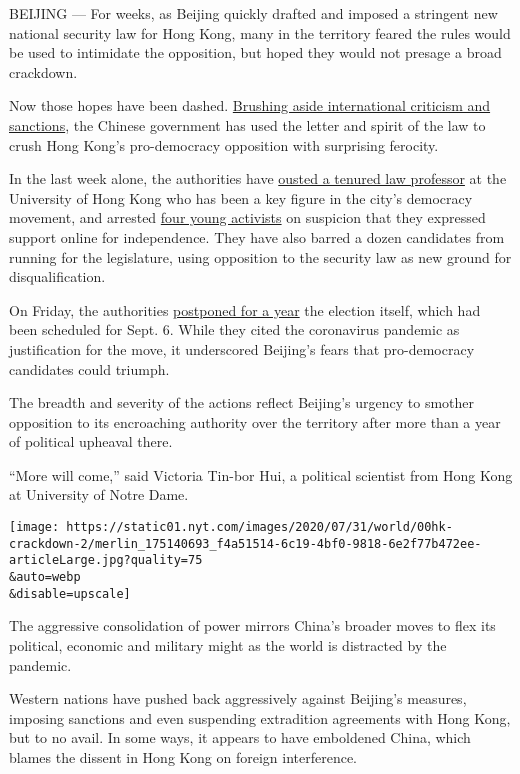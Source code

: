BEIJING --- For weeks, as Beijing quickly drafted and imposed a
stringent new national security law for Hong Kong, many in the territory
feared the rules would be used to intimidate the opposition, but hoped
they would not presage a broad crackdown.

Now those hopes have been dashed.
\href{https://www.nytimes.com/2020/07/15/world/asia/china-trump-hong-kong.html}{Brushing
aside international criticism and sanctions}, the Chinese government has
used the letter and spirit of the law to crush Hong Kong's pro-democracy
opposition with surprising ferocity.

In the last week alone, the authorities have
\href{https://www.nytimes.com/2020/07/28/world/asia/benny-tai-hong-kong-university.html}{ousted
a tenured law professor} at the University of Hong Kong who has been a
key figure in the city's democracy movement, and arrested
\href{https://www.nytimes.com/2020/07/29/world/asia/hong-kong-arrests-security-law.html}{four
young activists} on suspicion that they expressed support online for
independence. They have also barred a dozen candidates from running for
the legislature, using opposition to the security law as new ground for
disqualification.

On Friday, the authorities
\href{https://www.nytimes.com/2020/07/31/world/asia/hong-kong-election-delayed.html}{postponed
for a year} the election itself, which had been scheduled for Sept. 6.
While they cited the coronavirus pandemic as justification for the move,
it underscored Beijing's fears that pro-democracy candidates could
triumph.

The breadth and severity of the actions reflect Beijing's urgency to
smother opposition to its encroaching authority over the territory after
more than a year of political upheaval there.

``More will come,'' said Victoria Tin-bor Hui, a political scientist
from Hong Kong at University of Notre Dame.

\texttt{[image: https://static01.nyt.com/images/2020/07/31/world/00hk-crackdown-2/merlin\_175140693\_f4a51514-6c19-4bf0-9818-6e2f77b472ee-articleLarge.jpg?quality=75\\\&auto=webp\\\&disable=upscale]}

The aggressive consolidation of power mirrors China's broader moves to
flex its political, economic and military might as the world is
distracted by the pandemic.

Western nations have pushed back aggressively against Beijing's
measures, imposing sanctions and even suspending extradition agreements
with Hong Kong, but to no avail. In some ways, it appears to have
emboldened China, which blames the dissent in Hong Kong on foreign
interference.

